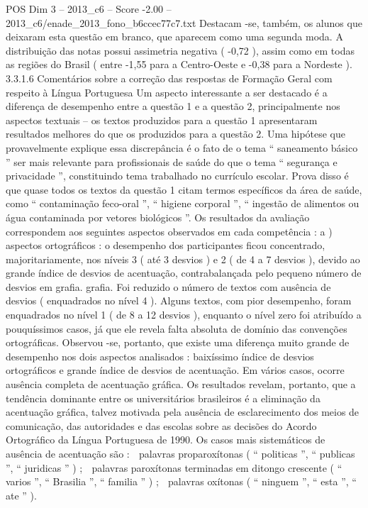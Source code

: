 \begin{textsample}{POS Dim 3 – 2013\_c6 – Score -2.00 – 2013\_c6/enade\_2013\_fono\_b6ccec77c7.txt}
Destacam -se, também, os alunos que deixaram esta questão em branco, que aparecem como uma segunda moda.
A distribuição das notas possui assimetria negativa ( -0,72 ), assim como em todas as regiões do Brasil ( entre -1,55 para a Centro-Oeste e -0,38 para a Nordeste ). 3.3.1.6 Comentários sobre a correção das respostas de Formação Geral com respeito à Língua Portuguesa Um aspecto interessante a ser destacado é a diferença de desempenho entre a questão 1 e a questão 2, principalmente nos aspectos textuais – os textos produzidos para a questão 1 apresentaram resultados melhores do que os produzidos para a questão 2.
Uma hipótese que provavelmente explique essa discrepância é o fato de o tema “ saneamento básico ” ser mais relevante para profissionais de saúde do que o tema “ segurança e privacidade ”, constituindo tema trabalhado no currículo escolar.
Prova disso é que quase todos os textos da questão 1 citam termos específicos da área de saúde, como “ contaminação feco-oral ”, “ higiene corporal ”, “ ingestão de alimentos ou água contaminada por vetores biológicos ”.
Os resultados da avaliação correspondem aos seguintes aspectos observados em cada competência : a ) aspectos ortográficos : o desempenho dos participantes ficou concentrado, majoritariamente, nos níveis 3 ( até 3 desvios ) e 2 ( de 4 a 7 desvios ), devido ao grande índice de desvios de acentuação, contrabalançada pelo pequeno número de desvios em grafia. grafia.
Foi reduzido o número de textos com ausência de desvios ( enquadrados no nível 4 ).
Alguns textos, com pior desempenho, foram enquadrados no nível 1 ( de 8 a 12 desvios ), enquanto o nível zero foi atribuído a pouquíssimos casos, já que ele revela falta absoluta de domínio das convenções ortográficas.
Observou -se, portanto, que existe uma diferença muito grande de desempenho nos dois aspectos analisados : baixíssimo índice de desvios ortográficos e grande índice de desvios de acentuação.
Em vários casos, ocorre ausência completa de acentuação gráfica.
Os resultados revelam, portanto, que a tendência dominante entre os universitários brasileiros é a eliminação da acentuação gráfica, talvez motivada pela ausência de esclarecimento dos meios de comunicação, das autoridades e das escolas sobre as decisões do Acordo Ortográfico da Língua Portuguesa de 1990.
Os casos mais sistemáticos de ausência de acentuação são :  palavras proparoxítonas ( “ politicas ”, “ publicas ”, “ juridicas ” ) ;  palavras paroxítonas terminadas em ditongo crescente ( “ varios ”, “ Brasilia ”, “ familia ” ) ;  palavras oxítonas ( “ ninguem ”, “ esta ”, “ ate ” ).

\end{textsample}
